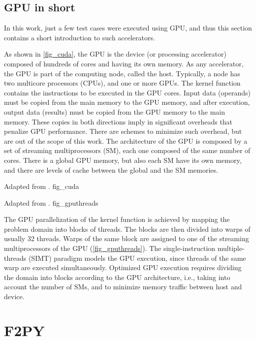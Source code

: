 %
%
%
\subsection{GPU in short}

In this work, just a few test cases were executed using GPU, and thus this section contains a short introduction to such accelerators.

As shown in \autoref {fig_cuda}, the GPU is the device (or processing accelerator) composed of hundreds of cores and having its own memory. As any accelerator, the GPU is part of the computing node, called the host. Typically, a node has two multicore processors (CPUs), and one or more GPUs. The kernel function contains the instructions to be executed in the GPU cores. Input data (operands) must be copied from the main memory to the GPU memory, and after execution, output data (results) must be copied from the GPU memory to the main memory. These copies in both directions imply in significant overheads that penalize GPU performance. There are schemes to minimize such overhead, but are out of the scope of this work. The architecture of the GPU is composed by a set of streaming multiprocessors (SM), each one composed of the same number of cores. There is a global GPU memory, but also each SM have its own memory, and there are levels of cache between the global and the SM memories.
 
     {Adapted from .} {fig_cuda}

     {Adapted from .} {fig_gputhreads}

The GPU parallelization of the kernel function is achieved by mapping the problem domain into blocks of threads. The blocks are then divided into warps of usually 32 threads. Warps of the same block are assigned to one of the streaming multiprocessors of the GPU (\autoref {fig_gputhreads}). The single-instruction multiple-threads (SIMT) paradigm models the GPU execution, since threads of the same warp are executed simultaneously. Optimized GPU execution requires dividing the domain into blocks according to the GPU architecture, i.e., taking into account the number of SMs, and to minimize memory traffic between host and device.

%
%
%
\section{F2PY}
\label{sec_apprf2py}

